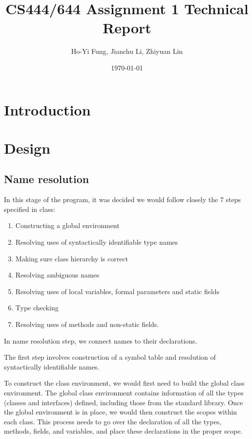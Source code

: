 \documentclass[a4paper, notitlepage]{report}
\title{CS444/644 Assignment 1 Technical Report}
\author{Ho-Yi Fung, Jianchu Li, Zhiyuan Lin}
\date{\today}
\begin{document}
{\let\newpage\relax\maketitle}
\begin{abstract}

\end{abstract}


\tableofcontents

\newpage

\chapter{Introduction}

\chapter{Design}

\section{Name resolution}
\label{design_name}
In this stage of the program, it was decided we would follow closely the 7 steps specified in class:
\begin{enumerate}
	\item Constructing a global environment
	\item Resolving uses of syntactically identifiable type names
	\item Making sure class hierarchy is correct
	\item Resolving ambiguous names
	\item Resolving uses of local variables, formal parameters and static fields
	\item Type checking
	\item Resolving uses of methods and non-static fields.
\end{enumerate}

In name resolution step, we connect names to their declarations.

The first step involves construction of a symbol table and resolution of syntactically identifiable names.

To construct the class environment, we would first need to build the global class environment. The global class environment contains information of all the types (classes and interfaces) defined, including those from the standard library. Once the global environment is in place, we would then construct the scopes within each class. This process  needs to go over the declaration of all the types, methods, fields, and variables, and place these declarations in the proper scope.
\end{document}
